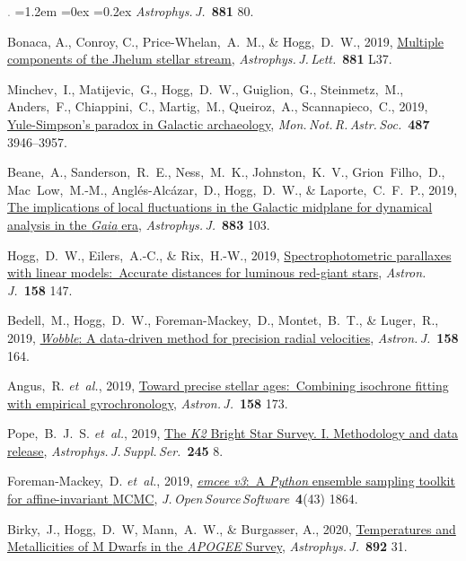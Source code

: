\documentclass[10pt,letterpaper]{article}
\newcommand{\acronym}[1]{{\small{#1}}}
\newcommand{\foreign}[1]{\textsl{#1}}
\newcommand{\etal}{\foreign{et~al.}}
\newcommand{\project}[1]{\textsl{#1}}
\newcommand{\doi}[2]{\href{http://dx.doi.org/#1}{{#2}}}
\newcommand{\deemph}[1]{\textcolor{grey}{\footnotesize{#1}}}
\newcommand{\pubnumber}[1]{\deemph{{#1}.}}
\newcounter{refpubnum}
\newcommand{\hogglist}{%
    \rightmargin=0in
    \leftmargin=1.2em
    \topsep=0ex
    \partopsep=0pt
    \itemsep=0.2ex
    \parsep=0pt
    \itemindent=-1.0\leftmargin
    \listparindent=0.0\leftmargin
    \settowidth{\labelsep}{~}
    \usecounter{refpubnum}
  }
\begin{document}
\begin{list}{\pubnumber{\therefpubnum}}{\hogglist}
\textit{Astrophys.\,J.}\ \textbf{881} 80.
\item
Bonaca, A., Conroy, C., Price-Whelan,~A.~M., \& Hogg,~D.~W., 2019,
\doi{10.3847/2041-8213/ab36ba}{Multiple components of the Jhelum stellar stream},
\textit{Astrophys.\,J.\,Lett.}\ \textbf{881} L37.
\item
Minchev,~I., Matijevic,~G., Hogg,~D.~W., Guiglion,~G., Steinmetz,~M.,
Anders,~F., Chiappini,~C., Martig,~M., Queiroz,~A., Scannapieco,~C., 2019,
\doi{10.1093/mnras/stz1239}{Yule-Simpson's paradox in Galactic archaeology},
\textit{Mon.\,Not.\,R.\,Astr.\,Soc.}\ \textbf{487} 3946--3957.
\item
Beane,~A., Sanderson,~R.~E., Ness,~M.~K., Johnston,~K.~V., Grion~Filho,~D.,
Mac~Low,~M.-M., Angl\'es-Alc\'azar,~D., Hogg,~D.~W., \& Laporte,~C.~F.~P., 2019,
\doi{10.3847/1538-4357/ab3d3c}{The implications of local fluctuations
in the Galactic midplane for dynamical analysis in the \project{Gaia} era},
\textit{Astrophys.\,J.}\ \textbf{883} 103.
\item
Hogg,~D.~W., Eilers,~A.-C., \& Rix,~H.-W., 2019,
\doi{10.3847/1538-3881/ab398c}{Spectrophotometric parallaxes with
linear models:\ Accurate distances for luminous red-giant stars},
\textit{Astron.\,J.}\ \textbf{158} 147.
\item
Bedell,~M., Hogg,~D.~W., Foreman-Mackey,~D., Montet,~B.~T., \& Luger,~R., 2019,
\doi{10.3847/1538-3881/ab40a7}{\project{Wobble}: A data-driven method for precision radial velocities},
\textit{Astron.\,J.}\ \textbf{158} 164.
\item
Angus,~R. \etal, 2019,
\doi{10.3847/1538-3881/ab3c53}{Toward precise stellar ages:\ Combining isochrone fitting with empirical gyrochronology},
\textit{Astron.\,J.}\ \textbf{158} 173.
\item
Pope,~B.~J.~S. \etal, 2019,
\doi{10.3847/1538-4365/ab3d29}{The \project{\acronym{K2}} Bright Star Survey. \acronym{I}. Methodology and data release},
\textit{Astrophys.\,J.\,Suppl.\,Ser.}\ \textbf{245} 8.
\item
Foreman-Mackey,~D. \etal, 2019,
\doi{10.21105/joss.01864}{\project{emcee v3}:\ A \project{Python} ensemble sampling toolkit for affine-invariant \acronym{MCMC}},
\textit{J.\,Open\,Source\,Software}\ \textbf{4}(43) 1864.
\item
Birky,~J., Hogg,~D.~W, Mann,~A.~W., \& Burgasser, A., 2020,
\doi{10.3847/1538-4357/ab7004}{Temperatures and Metallicities of M Dwarfs in the \project{\acronym{APOGEE}} Survey},
\textit{Astrophys.\,J.}\ \textbf{892} 31.
\item

\end{list}
\end{document}
